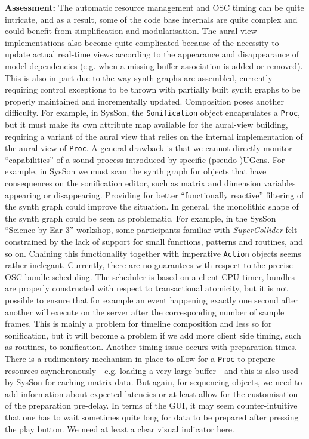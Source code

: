 \documentclass[11pt,a4paper]{article}
\newcommand{\software}[1]{\textit{#1}}
\newcommand{\sysson}[0]{SysSon}
\begin{document}
\textbf{Assessment:} The automatic resource management and OSC timing can be quite intricate, and as a result, some of the code base internals are quite complex and could benefit from simplification and modularisation. The aural view implementations also become quite complicated because of the necessity to update actual real-time views according to the appearance and disappearance of model dependencies (e.g. when a missing buffer association is added or removed). This is also in part due to the way synth graphs are assembled, currently requiring control exceptions to be thrown with partially built synth graphs to be properly maintained and incrementally updated. Composition poses another difficulty. For example, in \sysson{}, the \verb!Sonification! object encapsulates a \verb!Proc!, but it must make its own attribute map available for the aural-view building, requiring a variant of the aural view that relies on the internal implementation of the aural view of \verb!Proc!. A general drawback is that we cannot directly monitor ``capabilities'' of a sound process introduced by specific (pseudo-)UGens. For example, in \sysson{} we must scan the synth graph for objects that have consequences on the sonification editor, such as matrix and dimension variables appearing or disappearing. Providing for better ``functionally reactive'' filtering of the synth graph could improve the situation. In general, the monolithic shape of the synth graph could be seen as problematic. For example, in the \sysson{} ``Science by Ear 3'' workshop, some participants familiar with \software{SuperCollider} felt constrained by the lack of support for small functions, patterns and routines, and so on. Chaining this functionality together with imperative \verb!Action! objects seems rather inelegant. %
Currently, there are no guarantees with respect to the precise OSC bundle scheduling. The scheduler is based on a client CPU timer, bundles are properly constructed with respect to transactional atomicity, but it is not possible to ensure that for example an event happening exactly one second after another will execute on the server after the corresponding number of sample frames. This is mainly a problem for timeline composition and less so for sonification, but it will become a problem if we add more client side timing, such as routines, to sonification. Another timing issue occurs with preparation times. There is a rudimentary mechanism in place to allow for a \verb!Proc! to prepare resources asynchronously---e.g. loading a very large buffer---and this is also used by \sysson{} for caching matrix data. But again, for sequencing objects, we need to add information about expected latencies or at least allow for the customisation of the preparation pre-delay. In terms of the GUI, it may seem counter-intuitive that one has to wait sometimes quite long for data to be prepared after pressing the play button. We need at least a clear visual indicator here.
\end{document}

